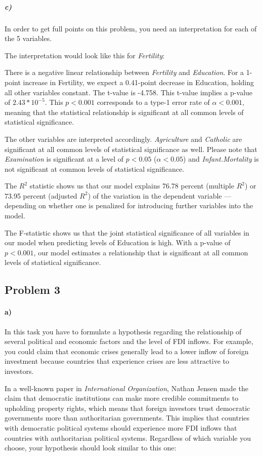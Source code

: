 \documentclass[12pt]{article}\usepackage[]{graphicx}\usepackage[]{color}
\begin{document}
\subparagraph{c)} In order to get full points on this problem, you need an interpretation for each of the 5 variables.

The interpretation would look like this for \textit{Fertility}:

There is a negative linear relationship between \textit{Fertility} and \textit{Education}. For a 1-point increase in Fertility, we expect a 0.41-point decrease in Education, holding all other variables constant. The t-value is -4.758. This t-value implies a p-value of $2.43*10^{-5}$. This $p < 0.001$ corresponds to a type-1 error rate of $\alpha < 0.001$, meaning that the statistical relationship is significant at all common levels of statistical significance.

The other variables are interpreted accordingly. \textit{Agriculture} and \textit{Catholic} are significant at all common levels of statistical significance as well. Please note that \textit{Examination} is significant at a level of $p < 0.05$ ($\alpha < 0.05$) and \textit{Infant.Mortality} is not significant at common levels of statistical significance.

The $R^2$ statistic shows us that our model explains 76.78 percent (multiple $R^2$) or 73.95 percent (adjusted $R^2$) of the variation in the dependent variable --- depending on whether one is penalized for introducing further variables into the model.

The F-statistic shows us that the joint statistical significance of all variables in our model when predicting levels of Education is high. With a p-value of $p < 0.001$, our model estimates a relationship that is significant at all common levels of statistical significance.



\subsection*{Problem 3}

\paragraph{a)} In this task you have to formulate a hypothesis regarding the relationship of several political and economic factors and the level of FDI inflows. For example, you could claim that economic crises generally lead to a lower inflow of foreign investment because countries that experience crises are less attractive to investors.

In a well-known paper in \textit{International Organization}, Nathan Jensen made the claim that democratic institutions can make more credible commitments to upholding property rights, which means that foreign investors trust democratic governments more than authoritarian governments. This implies that countries with democratic political systems should experience more FDI inflows that countries with authoritarian political systems. Regardless of which variable you choose, your hypothesis should look similar to this one:
\end{document}
